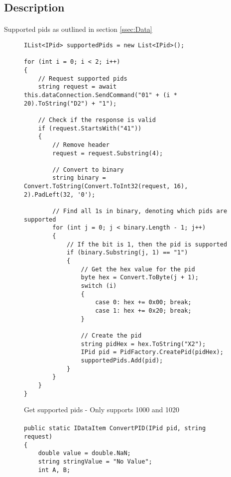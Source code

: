 	\subsection{Description}{		
		\paragraph{}{
		}
		
		\paragraph{}{
		Supported pids as outlined in section \ref{ssec:Data}
		}
		
		\begin{figure}[h]
			\begin{lstlisting}
IList<IPid> supportedPids = new List<IPid>();

for (int i = 0; i < 2; i++)
{
	// Request supported pids
	string request = await this.dataConnection.SendCommand("01" + (i * 20).ToString("D2") + "1");

	// Check if the response is valid
	if (request.StartsWith("41"))
	{
		// Remove header
		request = request.Substring(4);

		// Convert to binary
		string binary = Convert.ToString(Convert.ToInt32(request, 16), 2).PadLeft(32, '0');

		// Find all 1s in binary, denoting which pids are supported
		for (int j = 0; j < binary.Length - 1; j++)
		{
			// If the bit is 1, then the pid is supported
			if (binary.Substring(j, 1) == "1")
			{
				// Get the hex value for the pid
				byte hex = Convert.ToByte(j + 1);
				switch (i)
				{
					case 0: hex += 0x00; break;
					case 1: hex += 0x20; break;
				}
				
				// Create the pid
				string pidHex = hex.ToString("X2");
				IPid pid = PidFactory.CreatePid(pidHex);
				supportedPids.Add(pid);
			}
		}
	}
}
			\end{lstlisting}
			\caption{Get supported pids - Only supports 1000 and 1020}
			\label{code:SupportedPids}
		\end{figure}
		
		\paragraph{}{
		}
		
		\begin{figure}[h]
			\begin{lstlisting}
public static IDataItem ConvertPID(IPid pid, string request)
{
	double value = double.NaN;
	string stringValue = "No Value";
	int A, B;


\end{lstlisting}
\end{figure}}
